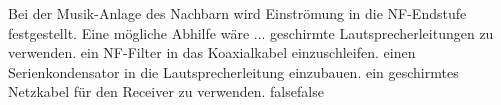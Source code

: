     {Bei der Musik-Anlage des Nachbarn wird Einströmung in die NF-Endstufe festgestellt. Eine mögliche Abhilfe wäre ...}
    {geschirmte Lautsprecherleitungen zu verwenden.}
    {ein NF-Filter in das Koaxialkabel einzuschleifen.}
    {einen Serienkondensator in die Lautsprecherleitung einzubauen.}
    {ein geschirmtes Netzkabel für den Receiver zu verwenden.}
    {false}{false}